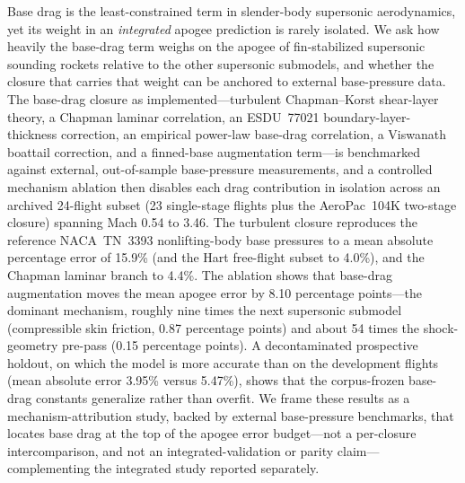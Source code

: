 Base drag is the least-constrained term in slender-body supersonic aerodynamics, yet its
weight in an \emph{integrated} apogee prediction is rarely isolated. We ask how heavily the
base-drag term weighs on the apogee of fin-stabilized supersonic sounding rockets relative
to the other supersonic submodels, and whether the closure that carries that weight can be
anchored to external base-pressure data. The base-drag closure as implemented---turbulent
Chapman--Korst shear-layer theory, a Chapman laminar correlation, an ESDU~77021
boundary-layer-thickness correction, an empirical power-law base-drag correlation, a
Viswanath boattail correction, and a finned-base augmentation term---is benchmarked against
external, out-of-sample base-pressure measurements, and a controlled mechanism ablation then
disables each drag contribution in isolation across an archived 24-flight subset (23
single-stage flights plus the AeroPac~104K two-stage closure) spanning Mach 0.54 to 3.46.
The turbulent closure reproduces the reference NACA~TN~3393 nonlifting-body base pressures
to a mean absolute percentage error of 15.9\% (and the Hart free-flight subset to 4.0\%),
and the Chapman laminar branch to 4.4\%. The ablation shows that base-drag augmentation
moves the mean apogee error by 8.10 percentage points---the dominant mechanism, roughly nine
times the next supersonic submodel (compressible skin friction, 0.87 percentage points) and
about 54 times the shock-geometry pre-pass (0.15 percentage points). A decontaminated
prospective holdout, on which the model is more accurate than on the development flights
(mean absolute error 3.95\% versus 5.47\%), shows that the corpus-frozen base-drag constants
generalize rather than overfit. We frame these results as a mechanism-attribution study,
backed by external base-pressure benchmarks, that locates base drag at the top of the apogee
error budget---not a per-closure intercomparison, and not an integrated-validation or parity
claim---complementing the integrated study reported separately.
